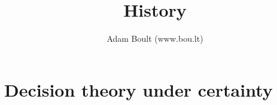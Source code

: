 \documentclass[oneside]{book}
\begin{document}
\author{Adam Boult (www.bou.lt)}
\title{History}
\maketitle

\setcounter{tocdepth}{0}
\tableofcontents



\part{Decision theory under certainty}

\end{document}
